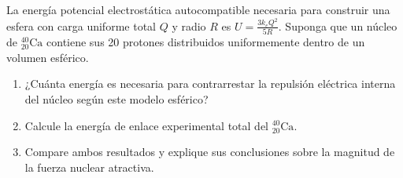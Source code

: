 \item La energía potencial electrostática autocompatible necesaria para construir una esfera con carga uniforme total $Q$ y radio $R$ es $U = \frac{3 k_e Q^2}{5R}$. Suponga que un núcleo de $^{40}_{20}\text{Ca}$ contiene sus 20 protones distribuidos uniformemente dentro de un volumen esférico.
\begin{enumerate}
    \item ¿Cuánta energía es necesaria para contrarrestar la repulsión eléctrica interna del núcleo según este modelo esférico?
    \item Calcule la energía de enlace experimental total del $^{40}_{20}\text{Ca}$.
    \item Compare ambos resultados y explique sus conclusiones sobre la magnitud de la fuerza nuclear atractiva.
\end{enumerate}